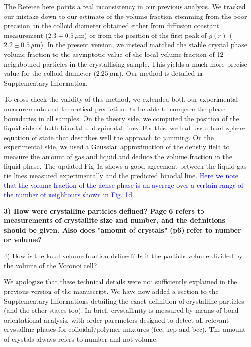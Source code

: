 \documentclass[11pt,a4paper]{article}
\newenvironment{referee}%
{\bigskip\singlespacing\bf}%
{\par\bigskip}
\begin{document}
The Referee here points a real inconsistency in our previous analysis. We tracked our mistake down to our estimate of the volume fraction stemming from the poor precision on the colloid diameter obtained either from diffusion constant measurement ($2.3\pm0.5\,\mu$m) or from the position of the first peak of $g(r)$ ($2.2\pm0.5\,\mu$m). In the present version, we instead matched the stable crystal phase volume fraction to the asymptotic value of the local volume fraction of 12-neighboured particles in the crystallising sample. This yields a much more precise value for the colloid diameter ($2.25\,\mu$m). Our method is detailed in Supplementary Information.

To cross-check the validity of this method, we extended both our experimental measurements and theoretical predictions to be able to compare the phase boundaries in all samples. On the theory side, we computed the position of the liquid side of both binodal and spinodal lines. For this, we had use a hard sphere equation of state that describes well the approach to jamming. On the experimental side, we used a Gaussian approximation of the density field to measure the amount of gas and liquid and deduce the volume fraction in the liquid phase. The updated Fig 1a shows a good agreement between the liquid-gas tie lines measured experimentally and the predicted binodal line. \textcolor{blue}{Here we note that the volume fraction of the dense phase is an average over a certain range of the number of neighbours 
shown in Fig. 1d.} 

\begin{referee}
3) How were crystalline particles defined? Page 6 refers to measurements of crystallite size and number, and the definitions should be given. Also does "amount of crystals" (p6) refer to number or volume?

4) How is the local volume fraction defined? Is it the particle volume divided by the volume of the Voronoi cell?
\end{referee}

We apologize that these technical details were not sufficiently explained in the previous version of the manuscript.
We have now added a section to the Supplementary Informations detailing the exact definition of crystalline particles
(and the other states too). In brief, crystallinity is measured by means of bond orientational analysis, with order
parameters designed to detect all relevant crystalline phases for colloidal/polymer mixtures (fcc, hcp and bcc).
The amount of crystals always refers to number and not volume.
\end{document}

